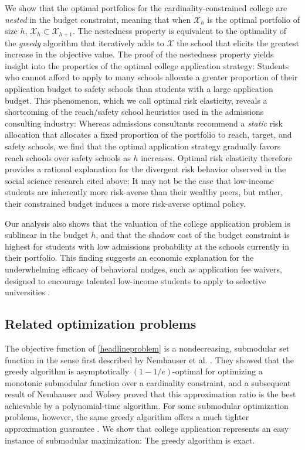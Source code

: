We show that the optimal portfolios for the cardinality-constrained college are \emph{nested} in the budget constraint, meaning that when $\mathcal{X}_h$ is the optimal portfolio of size $h$, $\mathcal{X}_h \subset \mathcal{X}_{h+1}$. The nestedness property is equivalent to the optimality of the \emph{greedy} algorithm that iteratively adds to $\mathcal{X}$ the school that elicits the greatest increase in the objective value. The proof of the nestedness property yields insight into the properties of the optimal college application strategy: Students who cannot afford to apply to many schools allocate a greater proportion of their application budget to safety schools than students with a large application budget. This phenomenon, which we call optimal risk elasticity, reveals a shortcoming of the reach/safety school heuristics used in the admissions consulting industry: Whereas admissions consultants recommend a \emph{static} risk allocation that allocates a fixed proportion of the portfolio to reach, target, and safety schools, we find that the optimal application strategy gradually favors reach schools over safety schools as $h$ increases. Optimal risk elasticity therefore provides a rational explanation for the divergent risk behavior observed in the social science research cited above: It may not be the case that low-income students are inherently more risk-averse than their wealthy peers, but rather, their constrained budget induces a more risk-averse optimal policy. 

Our analysis also shows that the valuation of the college application problem is sublinear in the budget $h$, and that the shadow cost of the budget constraint is highest for students with low admissions probability at the schools currently in their portfolio. This finding suggests an economic explanation for the underwhelming efficacy of behavioral nudges, such as application fee waivers, designed to encourage talented low-income students to apply to selective universities \cite{gurantzetal2021}. 

\subsection{Related optimization problems}

The objective function of \eqref{headlineproblem} is a nondecreasing, submodular set function in the sense first described by Nemhauser et al. \cite{nemhauseretal1978}. They showed that the greedy algorithm is asymptotically $(1 - 1/e)$-optimal for optimizing a monotonic submodular function over a cardinality constraint, and a subsequent result of Nemhauser and Wolsey \cite{nemhauserandwolsey1978} proved that this approximation ratio is the best achievable by a polynomial-time algorithm. For some submodular optimization problems, however, the same greedy algorithm offers a much tighter approximation guarantee \cite{contrerasandfernandez2014}. We show that college application represents an easy instance of submodular maximization: The greedy algorithm is exact.

